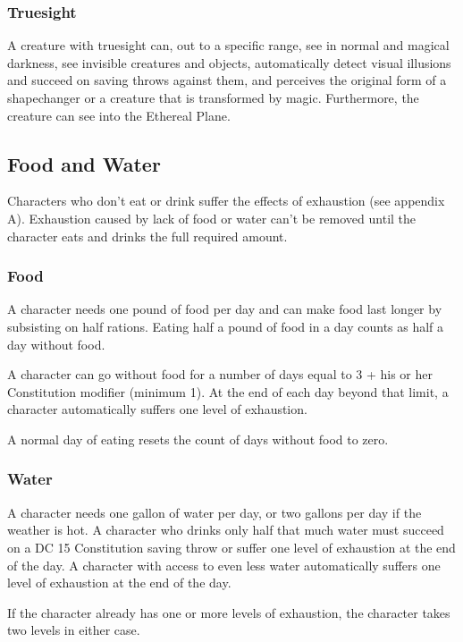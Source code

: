 \subsubsection{Truesight}

A creature with truesight can, out to a specific range, see in normal and magical darkness, see invisible creatures and objects, automatically detect visual illusions and succeed on saving throws against them, and perceives the original form of a shapechanger or a creature that is transformed by magic. Furthermore, the creature can see into the Ethereal Plane.

\subsection{Food and Water}

Characters who don't eat or drink suffer the effects of exhaustion (see appendix A). Exhaustion caused by lack of food or water can't be removed until the character eats and drinks the full required amount.

\subsubsection{Food}

A character needs one pound of food per day and can make food last longer by subsisting on half rations. Eating half a pound of food in a day counts as half a day without food.

A character can go without food for a number of days equal to 3 + his or her Constitution modifier (minimum 1). At the end of each day beyond that limit, a character automatically suffers one level of exhaustion.

A normal day of eating resets the count of days without food to zero.

\subsubsection{Water}

A character needs one gallon of water per day, or two gallons per day if the weather is hot. A character who drinks only half that much water must succeed on a DC 15 Constitution saving throw or suffer one level of exhaustion at the end of the day. A character with access to even less water automatically suffers one level of exhaustion at the end of the day.

If the character already has one or more levels of exhaustion, the character takes two levels in either case.

